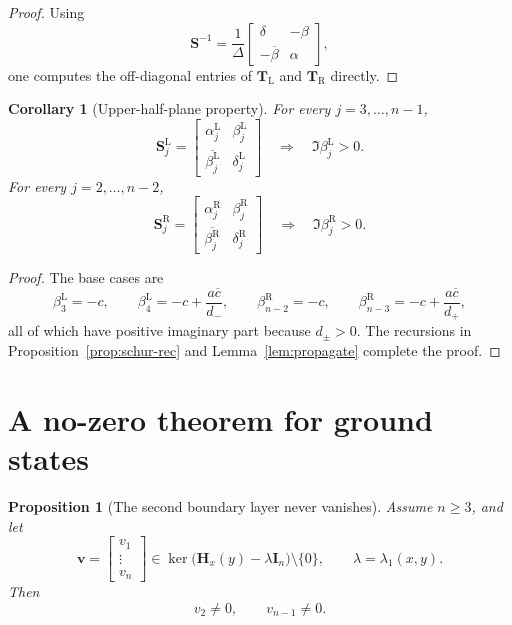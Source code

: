 \documentclass[11pt]{article}
\numberwithin{equation}{section}
\newtheorem{proposition}[theorem]{Proposition}
\newtheorem{corollary}[theorem]{Corollary}
\newcommand{\I}{\mathbf I}
\newcommand{\Hmat}{\mathbf H}
\begin{document}
\begin{proof}
Using
\[
\mathbf S^{-1}
=
\frac{1}{\Delta}
\begin{bmatrix}
\delta & -\beta\\
-\overline\beta & \alpha
\end{bmatrix},
\]
one computes the off-diagonal entries of \(\mathbf T_{\mathrm L}\) and
\(\mathbf T_{\mathrm R}\) directly.
\end{proof}

\begin{corollary}[Upper-half-plane property]\label{cor:upper}
For every \(j=3,\dots,n-1\),
\[
\mathbf S_j^{\mathrm L}
=
\begin{bmatrix}
\alpha_j^{\mathrm L} & \beta_j^{\mathrm L}\\
\overline{\beta_j^{\mathrm L}} & \delta_j^{\mathrm L}
\end{bmatrix}
\quad\Longrightarrow\quad
\Im\beta_j^{\mathrm L}>0.
\]
For every \(j=2,\dots,n-2\),
\[
\mathbf S_j^{\mathrm R}
=
\begin{bmatrix}
\alpha_j^{\mathrm R} & \beta_j^{\mathrm R}\\
\overline{\beta_j^{\mathrm R}} & \delta_j^{\mathrm R}
\end{bmatrix}
\quad\Longrightarrow\quad
\Im\beta_j^{\mathrm R}>0.
\]
\end{corollary}

\begin{proof}
The base cases are
\[
\beta_3^{\mathrm L}=-c,
\qquad
\beta_4^{\mathrm L}=-c+\frac{a\overline c}{d_-},
\qquad
\beta_{n-2}^{\mathrm R}=-c,
\qquad
\beta_{n-3}^{\mathrm R}=-c+\frac{a\overline c}{d_+},
\]
all of which have positive imaginary part because \(d_\pm>0\).  The recursions in
Proposition~\ref{prop:schur-rec} and Lemma~\ref{lem:propagate} complete the proof.
\end{proof}

\section{A no-zero theorem for ground states}
\label{sec:nozero}

\begin{proposition}[The second boundary layer never vanishes]
\label{prop:second-layer}
Assume \(n\ge3\), and let
\[
\bm v=
\begin{bmatrix}
v_1\\
\vdots\\
v_n
\end{bmatrix}
\in
\ker\bigl(\Hmat_x(y)-\lambda\I_n\bigr)\setminus\{0\},
\qquad
\lambda=\lambda_1(x,y).
\]
Then
\[
v_2\neq0,
\qquad
v_{n-1}\neq0.
\]
\end{proposition}
\end{document}
